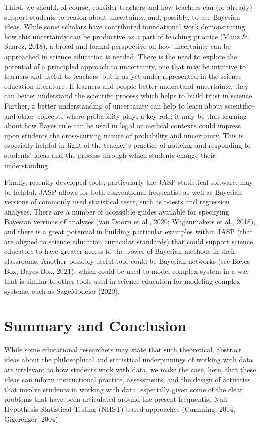 \documentclass[man]{apa7}
\begin{document}
Third, we should, of course, consider teachers and how teachers can (or already) support students to reason about uncertainty, and, possibly, to use Bayesian ideas. While some scholars have contributed foundational work demonstrating how this uncertainty can be productive as a part of teaching practice (Manz & Suarez, 2018), a broad and formal perspective on how uncertainty can be approached in science education is needed. There is the need to explore the potential of a principled approach to uncertainty, one that may be intuitive to learners and useful to teachers, but is as yet under-represented in the science education literature. If learners and people better understand uncertainty, they can better understand the scientific process which helps to build trust in science. Further, a better understanding of uncertainty can help to learn about scientific--and other--concepts where probability plays a key role; it may be that learning about how Bayes rule can be used in legal or medical contexts could impress upon students the cross-cutting nature of probability and uncertainty. This is especially helpful in light of the teacher's practice of noticing and responding to students' ideas and the process through which students change their understanding.

Finally, recently developed tools, particularly the JASP statistical software, may be helpful. JASP allows for both conventional frequentist as well as Bayesian versions of commonly used statistical tests, such as t-tests and regression analyses. There are a number of accessible guides available for specifying Bayesian versions of analyses (van Doorn et al., 2020; Wagenmakers et al., 2018), and there is a great potential in building particular examples within JASP (that are aligned to science education curricular standards) that could support science educators to have greater access to the power of Bayesian methods in their classrooms. Another possibly useful tool could be Bayesian networks (see Bayes Box; Bayes Box, 2021), which could be used to model complex system in a way that is similar to other tools used in science education for modeling complex systems, such as SageModeler (2020).

\section{Summary and Conclusion}

While some educational researchers may state that such theoretical, abstract ideas about the philosophical and statistical underpinnings of working with data are irrelevant to how students work with data, we make the case, here, that these ideas can inform instructional practice, assessments, and the design of activities that involve students in working with data, especially given some of the clear problems that have been articulated around the present frequentist Null Hypothesis Statistical Testing (NHST)-based approaches (Cumming, 2014; Gigerenzer, 2004). 
\end{document}

